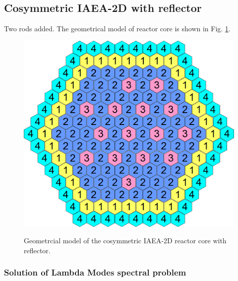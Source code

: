 \documentclass[authoryear]{elsarticle}
\begin{document}
\subsection{Cosymmetric IAEA-2D with reflector}
Two rods added.
The geometrical model of reactor core is shown in Fig. \ref{fig:iaea_cosym}. 

\begin{figure}[h]
\begin{center}
	\includegraphics[width=0.6\linewidth]{iaea_cosym.png}\\
	\caption{Geometrcial model of the cosymmetric IAEA-2D reactor core with reflector.}
	\label{fig:iaea_cosym}
\end{center}
\end{figure}

\subsubsection{Solution of Lambda Modes spectral problem}
\end{document}
